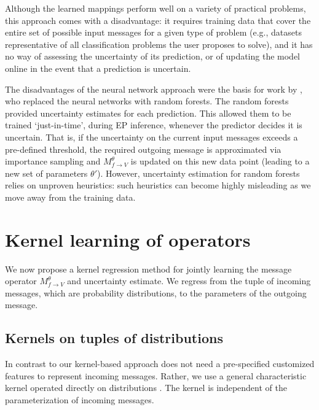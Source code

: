 \documentclass[english]{article}
\theoremstyle{plain}
\theoremstyle{plain}
\newcommand{\factor}{f}				%
\newcommand{\outV}{V}                         %
\newcommand{\approxMsg}[3]{M_{#1 \rightarrow #2}^{#3}}			%
\begin{document}
Although the learned mappings perform well on a variety of practical problems, 
this approach comes with a disadvantage: it requires training data
that cover the entire set of possible input messages for a given type of problem (e.g., datasets
representative of all classification problems the user proposes to solve),
and it has no way of assessing the uncertainty of its prediction, or of updating
the model online in the event that a prediction is uncertain.


The disadvantages of the neural network approach were the basis for work by
\citet{Eslami2014}, who replaced the neural networks with random forests.
The random forests  provided uncertainty estimates for each prediction. This
allowed them to be trained `just-in-time', during EP inference, whenever the
predictor decides it is uncertain. That is, if the uncertainty on the current
input messages exceeds a pre-defined threshold, the required outgoing message
is approximated via importance sampling  and
$\approxMsg{\factor}{\outV}{\theta}$ is updated on this new data point (leading
to a new set of parameters  $\theta'$). 
However, uncertainty estimation for random forests relies on unproven
heuristics: such heuristics can become highly misleading as we move away from
the training data.


\section{Kernel learning of operators}\label{sec:Online}

We now propose a kernel regression method for jointly learning the message operator $\approxMsg{\factor}{\outV}{\theta}$ and
uncertainty estimate. We regress from the tuple of incoming messages, which
are probability distributions, to the parameters of the outgoing message. 

\subsection{Kernels on tuples of distributions}\label{sec:kernelsOnDistributions}

In contrast to \citet{Eslami2014,Heess2013} our kernel-based approach does not
need a pre-specified customized features to represent incoming messages.
Rather, we use a general characteristic kernel operated directly on distributions
\citep[eq.  9]{Christmann2010}. The kernel is independent of the parameterization of 
incoming messages. 
\end{document}
